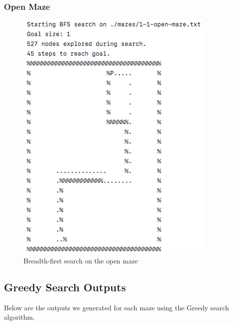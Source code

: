 \documentclass[titlepage]{article}
\begin{document}
\subsubsection{Open Maze}
\begin{figure}[h!]
\includegraphics[width=\linewidth]{bfsopen.png}
\caption{Breadth-first search on the open maze}
\label{fig:BFSopen}
\end{figure}

\newpage

\subsection{Greedy Search Outputs}
Below are the outputs we generated for each maze using the Greedy search algorithm. 
\end{document}
